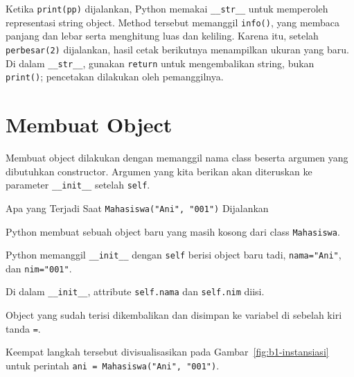 Ketika \texttt{print(pp)} dijalankan, Python memakai \texttt{\_\_str\_\_} untuk memperoleh representasi string object. Method tersebut memanggil \texttt{info()}, yang membaca panjang dan lebar serta menghitung luas dan keliling. Karena itu, setelah \texttt{perbesar(2)} dijalankan, hasil cetak berikutnya menampilkan ukuran yang baru. Di dalam \texttt{\_\_str\_\_}, gunakan \texttt{return} untuk mengembalikan string, bukan \texttt{print()}; pencetakan dilakukan oleh pemanggilnya.

\section{Membuat Object}

Membuat object dilakukan dengan memanggil nama class beserta argumen yang dibutuhkan constructor. Argumen yang kita berikan akan diteruskan ke parameter \texttt{\_\_init\_\_} setelah \texttt{self}.

\begin{langkah}{Apa yang Terjadi Saat \texttt{Mahasiswa("Ani", "001")} Dijalankan}
  \item Python membuat sebuah object baru yang masih kosong dari class \texttt{Mahasiswa}.
  \item Python memanggil \texttt{\_\_init\_\_} dengan \texttt{self} berisi object baru tadi, \texttt{nama="Ani"}, dan \texttt{nim="001"}.
  \item Di dalam \texttt{\_\_init\_\_}, attribute \texttt{self.nama} dan \texttt{self.nim} diisi.
  \item Object yang sudah terisi dikembalikan dan disimpan ke variabel di sebelah kiri tanda \texttt{=}.
\end{langkah}

Keempat langkah tersebut divisualisasikan pada Gambar~\ref{fig:b1-instansiasi} untuk perintah \texttt{ani = Mahasiswa("Ani", "001")}.

